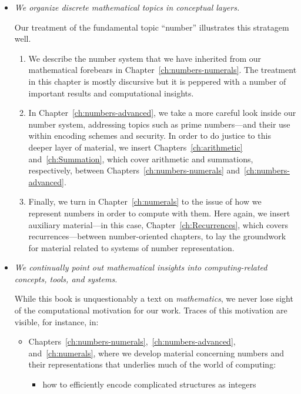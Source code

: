 \begin{itemize}
\medskip\item
{\em We organize discrete mathematical topics in conceptual layers.}

\smallskip

Our treatment of the fundamental topic ``number'' illustrates this stratagem well.
  \begin{enumerate}
  \item
We describe the number system that we have inherited from our mathematical forebears in Chapter~\ref{ch:numbers-numerals}.  The treatment in this chapter is mostly discursive but it is peppered with a number of important results and computational insights.
 \medskip \item
In Chapter~\ref{ch:numbers-advanced}, we take a more careful look inside our number system, addressing topics such as prime numbers---and their use within encoding schemes and security.  In order to do justice to this deeper layer of material, we insert Chapters~\ref{ch:arithmetic} and~\ref{ch:Summation}, which cover arithmetic and summations, respectively, between
Chapters~\ref{ch:numbers-numerals} and~\ref{ch:numbers-advanced}.
  \medskip\item
Finally, we turn in Chapter~\ref{ch:numerals} to the issue of how we represent numbers in order to compute with them.  Here again, we insert auxiliary material---in this case, Chapter~\ref{ch:Recurrences}, which covers recurrences---between number-oriented chapters, to lay the groundwork for material related to systems of number representation.
  \end{enumerate}

\item
{\em We continually point out mathematical insights into {\em computing-related} concepts, tools, and systems.}

\smallskip

While this book is unquestionably a text on {\em mathematics}, we never lose sight of the computational motivation for our work.  Traces of this motivation are visible, for instance, in:
  \begin{itemize}
  \item
Chapters~\ref{ch:numbers-numerals},~\ref{ch:numbers-advanced}, and~\ref{ch:numerals}, where we develop material concerning numbers and their representations that underlies much of the world of computing:
     \begin{itemize}
     \medskip\item
how to efficiently encode complicated structures as integers


\end{itemize}
\end{itemize}
\end{itemize}
